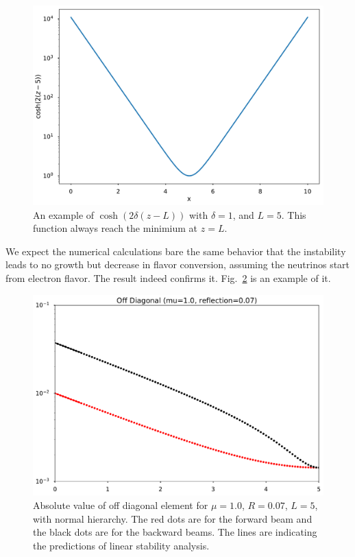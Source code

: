 \begin{figure}[!htbp]
    \centering
    \includegraphics[width=\textwidth]{chapters/assets/halo/cosh.pdf}
    \caption{ An example of $\cosh(2\delta(z-L))$ with $\delta=1$, and $L=5$. This function always reach the minimium at $z=L$.}
    \label{chap:halo-sec:line-sym-fig:cosh}
\end{figure}


We expect the numerical calculations bare the same behavior that the instability leads to no growth but decrease in flavor conversion, assuming the neutrinos start from electron flavor. The result indeed confirms it. Fig.~\ref{chap:halo-sec:line-sym-fig:mu-1.0-reflection-0.07} is an example of it.

\begin{figure}[htbp]
    \centering
    \includegraphics[width=\textwidth]{chapters/assets/halo/mu-1-reflection-0p07.pdf}
    \caption{Absolute value of off diagonal element for $\mu=1.0$, $R=0.07$, $L=5$, with normal hierarchy. The red dots are for the forward beam and the black dots are for the backward beams. The lines are indicating the predictions of linear stability analysis.}
    \label{chap:halo-sec:line-sym-fig:mu-1.0-reflection-0.07}
\end{figure}

